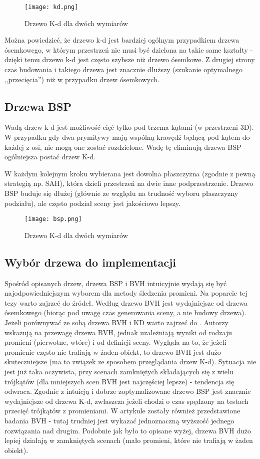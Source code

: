 \begin{figure}[h!]
\centering
  \caption{Drzewo K-d dla dwóch wymiarów}
  \texttt{[image: kd.png]}
\end{figure}

Można powiedzieć, że drzewo k-d jest bardziej ogólnym przypadkiem drzewa ósemkowego, w którym przestrzeń nie musi być dzielona na takie same kształty - dzięki temu drzewo k-d jest często szybsze niż drzewo ósemkowe. Z drugiej strony czas budowania i takiego drzewa jest znacznie dłuższy (szukanie optymalnego ,,przecięcia'') niż w przypadku drzew ósemkowych.


\subsection{Drzewa BSP}

Wadą drzew k-d jest możliwość cięć tylko pod trzema kątami (w przestrzeni 3D). W przypadku gdy dwa prymitywy mają wspólną krawędź będącą pod kątem do każdej z osi, nie mogą one zostać rozdzielone. Wadę tę eliminują drzewa BSP - ogólniejsza postać drzew K-d.

W każdym kolejnym kroku wybierana jest dowolna płaszczyzna (zgodnie z pewną strategią np. SAH), która dzieli przestrzeń na dwie inne podprzestrzenie. Drzewo BSP buduje się dłużej (głównie ze względu na trudność wyboru płaszczyzny podziału), ale często podział sceny jest jakościowo lepszy.


\begin{figure}[h!]
\centering
  \caption{Drzewo K-d dla dwóch wymiarów}
  \texttt{[image: bsp.png]}
\end{figure}


\subsection{Wybór drzewa do implementacji}

Spośród opisanych drzew, drzewa BSP i BVH intuicyjnie wydają się być najodpowiedniejszym wyborem dla metody śledzenia promieni. Na poparcie tej tezy warto zajrzeć do źródeł. Według \cite{bvhvsoctee} drzewo BVH jest wydajniejsze od drzewa ósemkowego (biorąc pod uwagę czas generowania sceny, a nie budowy drzewa). Jeżeli porównywać ze sobą drzewa BVH i KD warto zajrzeć do \cite{bvhvskd1, bvhvskd2}. Autorzy wskazują na przewagę drzewa BVH, jednak uzależniają wyniki od rodzaju promieni (pierwotne, wtóre) i od definicji sceny. Wygląda na to, że jeżeli promienie często nie trafiają w żaden obiekt, to drzewo BVH jest dużo skuteczniejsze (ma to związek ze sposobem przeglądania drzew K-d). Sytuacja nie jest już taka oczywista, przy scenach zamkniętych składających się z wielu trójkątów (dla mniejszych scen BVH jest najczęściej lepsze) - tendencja się odwraca. Zgodnie z intuicją i \cite{bspvskd} dobrze zoptymalizowane drzewo BSP jest znacznie wydajniejsze od drzewa K-d, zwłaszcza jeżeli chodzi o czas spędzony na testach przecięć trójkątów z promieniami. W artykule zostały również przedstawione badania BVH - tutaj trudniej jest wykazać jednoznaczną wyższość jednego rozwiązania nad drugim. Podobnie jak było to opisane wyżej, drzewa BVH dużo lepiej działają w zamkniętych scenach (mało promieni, które nie trafiają w żaden obiekt). 

